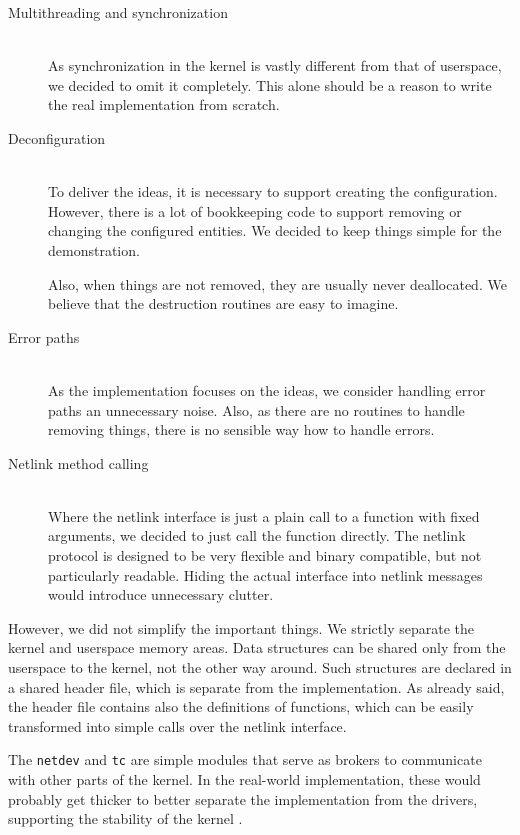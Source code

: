 \begin{description}
	\item[Multithreading and synchronization] \hfill \\
		As synchronization in the kernel is vastly different from that of
		user\-space, we decided to omit it completely. This alone should be
		a reason to write the real implementation from scratch.

	\item[Deconfiguration] \hfill \\
		To deliver the ideas, it is necessary to support creating the
		configuration. However, there is a lot of bookkeeping code to support
		removing or changing the configured entities. We decided to keep
		things simple for the demonstration.

		Also, when things are not removed, they are usually never deallocated.
		We believe that the destruction routines are easy to imagine.

	\item[Error paths] \hfill \\
		As the implementation focuses on the ideas, we consider handling error
		paths an unnecessary noise. Also, as there are no routines to handle
		removing things, there is no sensible way how to handle errors.

	\item[Netlink method calling] \hfill \\
		Where the netlink interface is just a plain call to a function with
		fixed arguments, we decided to just call the function directly. The
		netlink protocol is designed to be very flexible and binary
		compatible, but not particularly readable. Hiding the actual interface
		into netlink messages would introduce unnecessary clutter.
\end{description}

\noindent However, we did not simplify the important things. We strictly separate the
kernel and userspace memory areas. Data structures can be shared only from the
userspace to the kernel, not the other way around. Such structures are declared
in a shared header file, which is separate from the implementation. As already
said, the header file contains also the definitions of functions, which can be
easily transformed into simple calls over the netlink interface.

The \texttt{netdev} and \texttt{tc} are simple modules that serve as brokers to
communicate with other parts of the kernel. In the real-world implementation, these
would probably get thicker to better separate the implementation from the drivers,
supporting the stability of the kernel .

